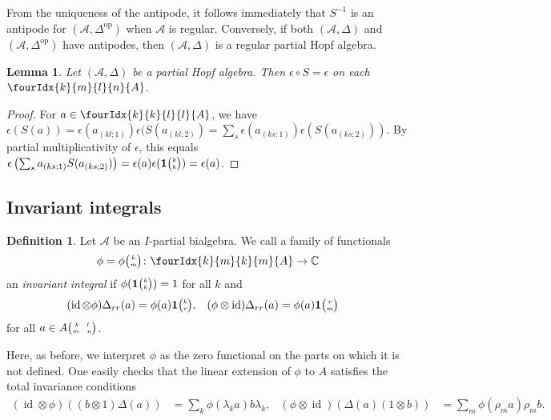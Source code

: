 \documentclass[10pt]{article}
\DeclareMathOperator{\id}{id}
\DeclareMathOperator{\op}{\mathrm{op}}
\newcommand{\C}{\mathbb{C}}
\newcommand{\Grt}[3]{#1{\tiny {\begin{pmatrix} #2\\#3\end{pmatrix}}}}
\newcommand{\UnitC}[2]{\Grt{\mathbf{1}}{#1}{#2}}
\newcommand{\pmat}[4]{{\tiny \begin{pmatrix} #1 \quad #2 \\ #3 \quad #4\end{pmatrix}}}
\newcommand{\Gr}[5]{\fourIdx{#2}{#4}{#3}{#5}{#1}}%
\newtheorem{Lem}[Theorem]{Lemma}
\theoremstyle{definition}
\newtheorem{Def}[Theorem]{Definition}
\newcommand{\phic}[2]{\Grt{\phi}{#1}{#2}}
\numberwithin{equation}{section}
\begin{document}
From the uniqueness of the antipode, it follows immediately that $S^{-1}$ is an antipode for $(\mathscr{A},\Delta^{\op})$ when $\mathscr{A}$ is regular. Conversely, if both $(\mathscr{A},\Delta)$ and $(\mathscr{A},\Delta^{\op})$ have antipodes, then $(\mathscr{A},\Delta)$ is a regular partial Hopf algebra. 

\begin{Lem}\label{LemCoAnt} Let $(\mathscr{A},\Delta)$ be a partial Hopf algebra. Then $\epsilon\circ S = \epsilon$ on each $\Gr{A}{k}{l}{m}{n}$.
\end{Lem}

\begin{proof} For $a\in \Gr{A}{k}{l}{k}{l}$, we have $\epsilon(S(a)) = \epsilon(a_{(kl;1)})\epsilon(S(a_{(kl;2)}) = \sum_s \epsilon(a_{(ks;1)})\epsilon(S(a_{(ks;2)}))$. By partial multiplicativity of $\epsilon$, this equals  $\epsilon\left( \sum_s a_{(ks;1)}S(a_{(ks;2)})\right) = \epsilon(a)\epsilon(\UnitC{k}{k})= \epsilon(a)$. 
\end{proof} 

\subsection{Invariant integrals}

\begin{Def}
  Let $\mathscr{A}$ be an $I$-partial bialgebra.  We call a family of
  functionals
\begin{align} \label{eq:functionals}
  \phi = \phic{k}{m} \colon \Gr{A}{k}{k}{m}{m} \to \C
\end{align}
an \emph{invariant} \emph{integral} if
 $\phi(\UnitC{k}{k})=1$ for all $k$ and
\begin{align}
  \label{eq:integral}
   (\id \otimes \phi)\Delta_{rr}(a) 
&= \phi(a)
  \UnitC{k}{r}, &   (\phi \otimes
  \id)\Delta_{rr}(a)&=\phi(a) \UnitC{r}{m}
\end{align}
 for all $a \in A\pmat{k}{l}{m}{n}$. 
\end{Def}

Here, as before, we interpret $\phi$ as the zero functional on the parts on which it is not defined. One easily checks that the linear extension of $\phi$ to $A$ satisfies the total invariance conditions \begin{align*}
(\id\otimes \phi)((b\otimes 1)\Delta(a)) &= \sum_{k}\phi(\lambda_{k}a)b\lambda_k,&  (\phi\otimes \id)(\Delta(a)(1\otimes b)) &= \sum_{m}
\phi(\rho_{m} a)\rho_m b.\end{align*}
\end{document}
